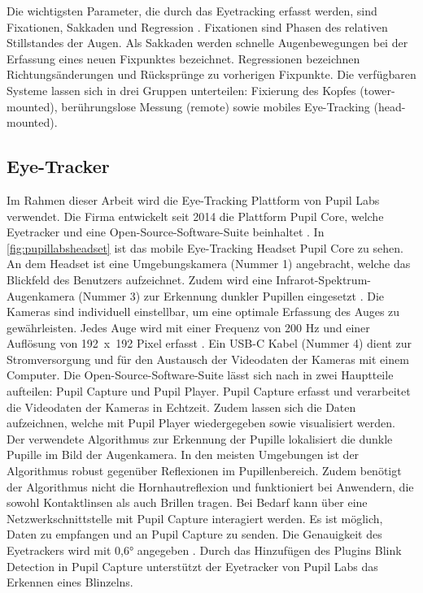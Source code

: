 Die wichtigsten Parameter, die durch das Eyetracking erfasst werden, sind Fixationen, Sakkaden und Regression \cite{BartlPokorny.2013}. \glqq Fixationen sind Phasen des relativen Stillstandes der Augen.\grqq{} \cite{Blake.2013} Als Sakkaden werden schnelle Augenbewegungen bei der Erfassung eines neuen Fixpunktes bezeichnet. Regressionen bezeichnen Richtungsänderungen und Rücksprünge zu vorherigen Fixpunkte. Die verfügbaren Systeme lassen sich in drei Gruppen unterteilen: Fixierung des Kopfes (tower-mounted), berührungslose Messung (remote) sowie mobiles Eye-Tracking (head-mounted). \cite{BartlPokorny.2013}

\subsection{Eye-Tracker}
Im Rahmen dieser Arbeit wird die Eye-Tracking Plattform von Pupil Labs verwendet. Die Firma entwickelt seit 2014 die Plattform Pupil Core, welche Eyetracker und eine Open-Source-Software-Suite beinhaltet \cite{PupilLabs-About.2020}. In \autoref{fig:pupillabsheadset} ist das mobile Eye-Tracking Headset Pupil Core zu sehen. An dem Headset ist eine Umgebungskamera (Nummer 1) angebracht, welche das Blickfeld des Benutzers aufzeichnet. Zudem wird eine Infrarot-Spektrum-Augenkamera (Nummer 3) zur Erkennung dunkler Pupillen eingesetzt \cite{Kassner_2014}. Die Kameras sind individuell einstellbar, um eine optimale Erfassung des Auges zu gewährleisten. Jedes Auge wird mit einer Frequenz von 200 Hz und einer Auflösung von \mbox{192 x 192} Pixel erfasst \cite{PupilLabsSpec}. Ein USB-C Kabel (Nummer 4) dient zur Stromversorgung und für den Austausch der Videodaten der Kameras mit einem Computer. Die Open-Source-Software-Suite lässt sich nach \citeauthor{Kassner_2014} in zwei Hauptteile aufteilen: Pupil Capture und Pupil Player. Pupil Capture erfasst und verarbeitet die Videodaten der Kameras in Echtzeit. Zudem lassen sich die Daten aufzeichnen, welche mit Pupil Player wiedergegeben sowie visualisiert werden. Der verwendete Algorithmus zur Erkennung der Pupille lokalisiert die dunkle Pupille im Bild der Augenkamera. In den meisten Umgebungen ist der Algorithmus robust gegenüber Reflexionen im Pupillenbereich. Zudem benötigt der Algorithmus nicht die Hornhautreflexion und funktioniert bei Anwendern, die sowohl Kontaktlinsen als auch Brillen tragen. \cite{Kassner_2014} Bei Bedarf kann über eine Netzwerkschnittstelle mit Pupil Capture interagiert werden. Es ist möglich, Daten zu empfangen und an Pupil Capture zu senden. \cite{PupilLabsNet} Die Genauigkeit des Eyetrackers wird mit 0,6° angegeben \cite{PupilLabsSpec}. Durch das Hinzufügen des Plugins \glqq Blink Detection\grqq{} in Pupil Capture unterstützt der Eyetracker von Pupil Labs das Erkennen eines Blinzelns. \cite{PupilCapture.2020}

